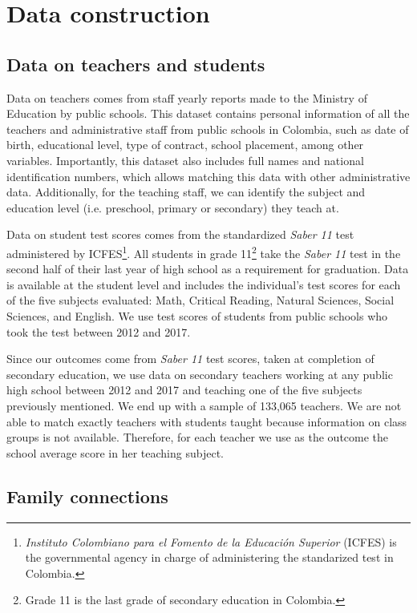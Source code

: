 \documentclass[12pt,runningheads]{article}
\begin{document}
\section{Data construction} 

\subsection{Data on teachers and students} 
Data on teachers comes from staff yearly reports made to the Ministry of Education by public schools. This dataset contains personal information of all the teachers and administrative staff from public schools in Colombia, such as date of birth, educational level, type of contract, school placement, among other variables. Importantly, this dataset also includes full names and national identification numbers, which allows matching this data with other administrative data. Additionally, for the teaching staff, we can identify the subject and education level (i.e. preschool, primary or secondary) they teach at. 

Data on student test scores comes from the standardized \textit{Saber 11} test administered by ICFES\footnote{\textit{Instituto Colombiano para el Fomento de la Educación Superior} (ICFES) is the governmental agency in charge of administering the standarized test in Colombia.}. All students in grade 11\footnote{Grade 11 is the last grade of secondary education in Colombia.} take the \textit{Saber 11} test in the second half of their last year of high school as a requirement for graduation. Data is available at the student level and includes the individual's test scores for each of the five subjects evaluated: Math, Critical Reading, Natural Sciences, Social Sciences, and English. We use test scores of students from public schools who took the test between 2012 and 2017. 

Since our outcomes come from \textit{Saber 11} test scores, taken at completion of secondary education, we use data on secondary teachers working at any public high school between 2012 and 2017 and teaching one of the five subjects previously mentioned. We end up with a sample of 133,065 teachers. We are not able to match exactly teachers with students taught because information on class groups is not available. Therefore, for each teacher we use as the outcome the school average score in her teaching subject. 

\subsection{Family connections} 
\end{document}
